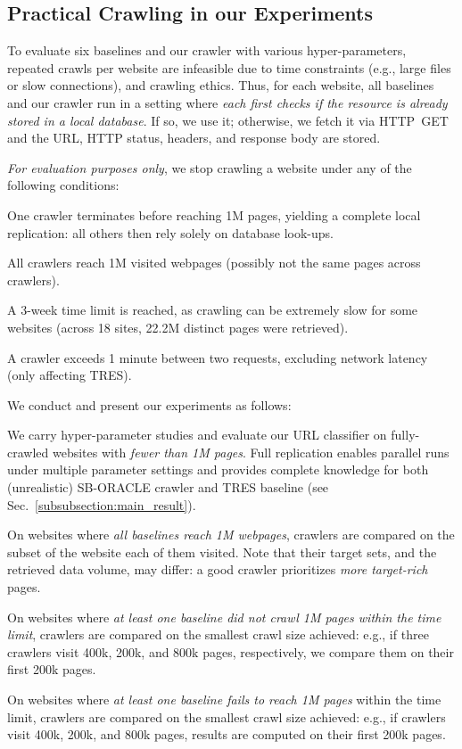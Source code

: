 \subsection{Practical Crawling in our Experiments}
\label{sec:exp-crawl-modalities}

To evaluate six baselines and our crawler with various
hyper-parameters, repeated crawls per website are infeasible
due to time constraints (e.g., large files or slow connections), and crawling ethics. Thus, for each website, all baselines and our crawler run in a setting where \emph{each first checks if the resource is already stored in a local database}. If so, we use it; otherwise, we fetch it via HTTP~GET and the URL, HTTP status, headers, and response body are stored.

\emph{For evaluation purposes only}, we stop crawling a website under any of the following conditions:
\begin{inparaenum}[(i)]
	\item One crawler terminates before reaching 1M pages, yielding a complete local replication: all others then rely solely on database look-ups.
	\item All crawlers reach 1M visited webpages (possibly not the
          same pages across crawlers).
    \item A 3-week time limit is reached, as crawling can be extremely slow for some websites (across 18 sites, 22.2M distinct pages were retrieved).
	\item A crawler exceeds 1 minute between two requests, excluding network latency (only affecting \textsf{\small TRES}).
\end{inparaenum}

We conduct and present our experiments as follows:
\begin{inparaenum}[(i)]
    \item We carry hyper-parameter studies and evaluate our URL classifier on fully-crawled websites with \emph{fewer than 1M pages}. Full replication enables parallel runs under multiple parameter settings and provides complete knowledge for both (unrealistic) \textsf{\small SB-ORACLE} crawler and \textsf{\small TRES} baseline (see Sec.~\ref{subsubsection:main_result}).
	\item On websites where \emph{all baselines reach 1M webpages}, crawlers are compared on the subset of the website each of them visited. Note that their target sets, and the retrieved data volume, may differ: a good crawler prioritizes \emph{more target-rich} pages.
    \item On websites where \emph{at least one baseline did not crawl 1M pages within the time limit}, crawlers are compared on the smallest crawl size achieved: e.g., if three crawlers visit 400k, 200k, and 800k pages, respectively, we compare them on their first 200k pages.
    \item On websites where \emph{at least one baseline fails to reach 1M pages} within the time limit, crawlers are compared on the smallest crawl size achieved: e.g., if crawlers visit 400k, 200k, and 800k pages, results are computed on their first 200k pages.

\end{inparaenum}

